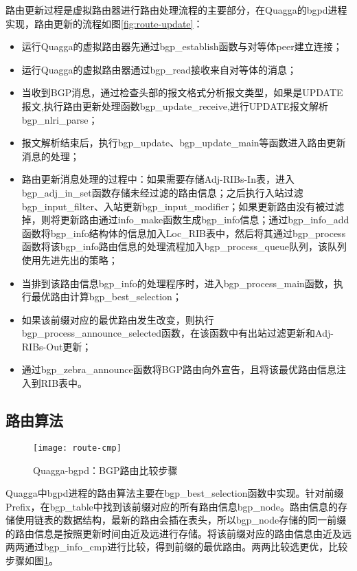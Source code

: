 路由更新过程是虚拟路由器进行路由处理流程的主要部分，在Quagga的bgpd进程实现，路由更新的流程如图\ref{fig:route-update}：
\begin{itemize}
  \item 运行Quagga的虚拟路由器先通过bgp\_establish函数与对等体peer建立连接；
  \item 运行Quagga的虚拟路由器通过bgp\_read接收来自对等体的消息；
  \item 当收到BGP消息，通过检查头部的报文格式分析报文类型，如果是UPDATE报文,执行路由更新处理函数bgp\_update\_receive,进行UPDATE报文解析bgp\_nlri\_parse；
  \item 报文解析结束后，执行bgp\_update、bgp\_update\_main等函数进入路由更新消息的处理；
  \item 路由更新消息处理的过程中：如果需要存储Adj-RIBs-In表，进入bgp\_adj\_in\_set函数存储未经过滤的路由信息；之后执行入站过滤bgp\_input\_filter、入站更新bgp\_input\_modifier；如果更新路由没有被过滤掉，则将更新路由通过info\_make函数生成bgp\_info信息；通过bgp\_info\_add函数将bgp\_info结构体的信息加入Loc\_RIB表中，然后将其通过bgp\_process函数将该bgp\_info路由信息的处理流程加入bgp\_process\_queue队列，该队列使用先进先出的策略；
  \item 当排到该路由信息bgp\_info的处理程序时，进入bgp\_process\_main函数，执行最优路由计算bgp\_best\_selection；
  \item 如果该前缀对应的最优路由发生改变，则执行bgp\_process\_announce\_selected函数，在该函数中有出站过滤更新和Adj-RIBs-Out更新；
  \item 通过bgp\_zebra\_announce函数将BGP路由向外宣告，且将该最优路由信息注入到RIB表中。
\end{itemize}

\subsection{路由算法}


\begin{figure}
  \centering
  \texttt{[image: route-cmp]}
  \caption{Quagga-bgpd：BGP路由比较步骤}
  \label{fig:route-cmp}
\end{figure}

Quagga中bgpd进程的路由算法主要在bgp\_best\_selection函数中实现。针对前缀Prefix，在bgp\_table中找到该前缀对应的所有路由信息bgp\_node。路由信息的存储使用链表的数据结构，最新的路由会插在表头，所以bgp\_node存储的同一前缀的路由信息是按照更新时间由近及远进行存储。将该前缀对应的路由信息由近及远两两通过bgp\_info\_cmp进行比较，得到前缀的最优路由。两两比较选更优，比较步骤如图\ref{fig:route-cmp}。


